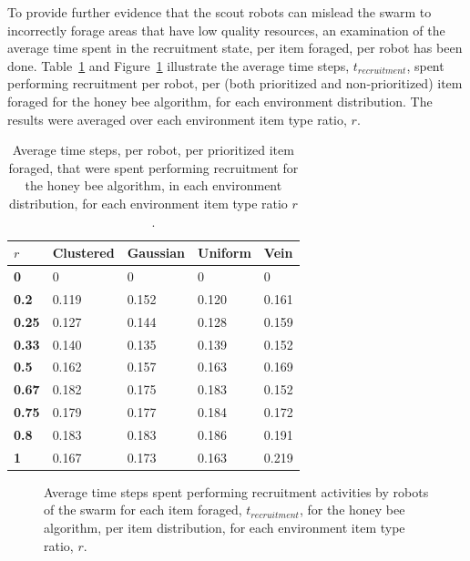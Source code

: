 \documentclass[preprint,12pt]{elsarticle}
\begin{document}
To provide further evidence that the scout robots can mislead the swarm to incorrectly forage areas that have low quality resources, an examination of the average time spent in the recruitment state, per item foraged, per robot has been done. Table~\ref{averagetimerecruitment} and Figure~\ref{fig:recruitmenttime} illustrate the average time steps, $t_{recruitment}$, spent performing recruitment per robot, per (both prioritized and non-prioritized) item foraged for the honey bee algorithm, for each environment distribution. The results were averaged over each environment item type ratio, $r$. 

\begin{table}[!htbp]
\centering
\caption{Average time steps, per robot, per prioritized item foraged, that were spent performing recruitment for the honey bee algorithm, in each environment distribution, for each environment item type ratio $r$.}
\label{averagetimerecruitment}
\begin{tabular}{@{}lllll@{}}
\toprule
$r$            & \textbf{Clustered} & \textbf{Gaussian} & \textbf{Uniform} & \textbf{Vein} \\ \midrule
\textbf{0}        & 0        & 0       & 0      & 0   \\
\textbf{0.2}      & 0.119        & 0.152       & 0.120       & 0.161   \\
\textbf{0.25}     & 0.127        & 0.144       & 0.128      & 0.159   \\
\textbf{0.33} & 0.140        & 0.135       & 0.139      & 0.152   \\
\textbf{0.5}      & 0.162        & 0.157        & 0.163       & 0.169   \\
\textbf{0.67} & 0.182        & 0.175       & 0.183      & 0.152   \\
\textbf{0.75}     & 0.179        & 0.177       & 0.184      & 0.172   \\
\textbf{0.8}      & 0.183        & 0.183       & 0.186      & 0.191   \\
\textbf{1}        & 0.167        & 0.173       & 0.163      & 0.219   \\ \bottomrule
\end{tabular}
\end{table}


\begin{figure}[htb]
\centering
\resizebox{\textwidth}{!}{}
\caption{Average time steps spent performing recruitment activities by robots of the swarm for each item foraged, $t_{recruitment}$, for the honey bee algorithm, per item distribution, for each environment item type ratio, $r$.}
\label{fig:recruitmenttime}
\end{figure}
\end{document}
